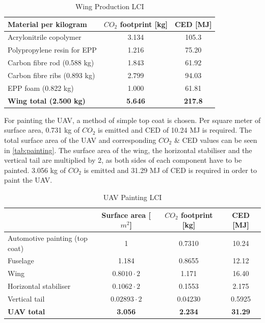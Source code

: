 
\begin{table}[H]
\centering
\caption{Wing Production LCI}
\label{tab:winglci}
    \begin{tabular}{lcc}
    \toprule
    Material per kilogram       & $CO_{2}$ footprint [kg] & CED [MJ] \\\midrule
    Acrylonitrile copolymer     & 3.134                & 105.3    \\\hdashline
    Polypropylene resin for EPP & 1.216                & 75.20    \\\hline
    Carbon fibre rod (0.588 kg)       &  1.843                    &  61.92        \\\hdashline
    Carbon fibre ribs (0.893 kg)      &   2.799                  &  94.03           \\\hdashline
    EPP foam (0.822 kg)         &   1.000                   &  61.81        \\\hline \hline
    \textbf{Wing total (2.500 kg)}   & \textbf{5.646}                     & \textbf{217.8}              \\\bottomrule
    \end{tabular}
\end{table}

For painting the UAV, a method of simple top coat is chosen. Per square meter of surface area, 0.731 kg of $CO_{2}$ is emitted and CED of  10.24 MJ is required. The total surface area of the UAV and corresponding $CO_{2}$ \& CED values can be seen in \autoref{tab:painting}. The surface area of the wing, the horizontal stabiliser and the vertical tail are multiplied by 2, as both sides of each component have to be painted. 3.056 kg of $CO_{2}$ is emitted and 31.29 MJ of CED is required in order to paint the UAV.

\begin{table}[H]
\centering
\caption{UAV Painting LCI}
\label{tab:painting}
    \begin{tabular}{lccc}
    \toprule
                          & Surface area [$m^2$] & $CO_{2}$ footprint [kg] & CED [MJ] \\\midrule
    Automotive painting (top coat) & 1  &   0.7310 & 10.24 \\\hline
    Fuselage              & 1.184                    & 0.8655                 & 12.12    \\\hdashline
    Wing                  & $0.8010\cdot2$                 & 1.171                  & 16.40    \\\hdashline
    Horizontal stabiliser & $0.1062\cdot2$                 & 0.1553                 & 2.175    \\\hdashline
    Vertical tail         & $0.02893\cdot2$                & 0.04230                & 0.5925   \\\hline \hline
    \textbf{UAV total}             & \textbf{3.056}                    & \textbf{2.234}                  & \textbf{31.29}    \\\bottomrule
    \end{tabular}
\end{table}

